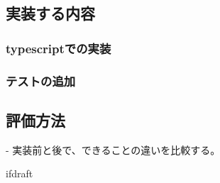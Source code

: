 \documentclass{jsarticle}
\begin{document}
\subsection{実装する内容}

\subsubsection{typescriptでの実装}

\subsubsection{テストの追加}


\subsection{評価方法}
- 実装前と後で、できることの違いを比較する。

\expandafter\ifx\csname ifdraft\endcsname\relax
\end{document}
